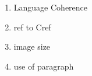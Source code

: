 \begin{enumerate}
    \item Language Coherence
    \item ref to Cref
    \item image size 
    \item use of paragraph 
\end{enumerate}